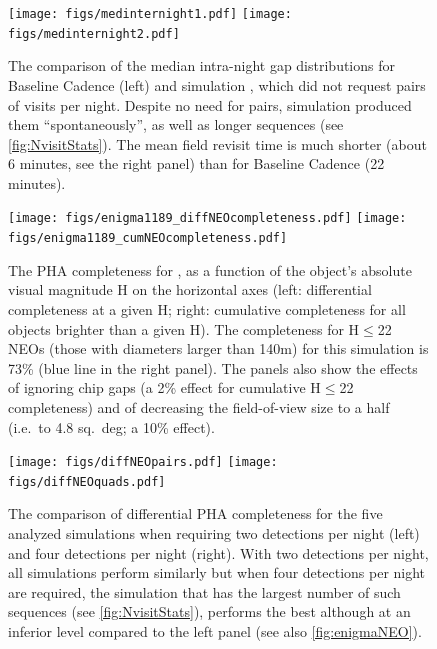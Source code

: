 \begin{figure}[t!]
\vskip -1.2in
\texttt{[image: figs/medinternight1.pdf]}
\texttt{[image: figs/medinternight2.pdf]}
\vskip -1.3in
\caption{%
The comparison of the median intra-night gap distributions for Baseline Cadence (left)
and simulation , which did not request pairs of visits per night.
Despite no need for pairs, simulation  produced them ``spontaneously'',
as well as longer sequences (see \autoref{fig:NvisitStats}). The mean field revisit
time is much shorter (about 6 minutes, see the right panel) than for Baseline Cadence
(22 minutes).}
\label{fig:intranightgapCompare}
\end{figure}

\begin{figure}[t!]
\vskip -1.1in
\texttt{[image: figs/enigma1189\_diffNEOcompleteness.pdf]}
\hskip -0.5in
\texttt{[image: figs/enigma1189\_cumNEOcompleteness.pdf]}
\vskip -1.2in
\caption{The PHA completeness for , as a function of the object's absolute
visual magnitude H on the horizontal axes (left: differential completeness at a given H;
right: cumulative completeness for all objects brighter than a given H).
The completeness for H$\le$22 NEOs (those with diameters larger than 140m)  for this
simulation is 73\% (blue line in the right panel). The panels also show the effects of ignoring
chip gaps (a 2\% effect for cumulative H$\le$22 completeness) and of decreasing the
field-of-view size to a half (i.e.\ to 4.8 sq.\ deg; a 10\% effect).}
\label{fig:enigmaNEO}
\end{figure}

\begin{figure}[th!]
\vskip -1.2in
\texttt{[image: figs/diffNEOpairs.pdf]}
\texttt{[image: figs/diffNEOquads.pdf]}
\vskip -1.3in
\caption{%
The comparison of differential PHA completeness for the five analyzed simulations
when requiring two detections per night (left) and four detections per night (right).
With two detections per night, all simulations perform similarly but when four
detections per night are required, the simulation that has the largest number
of such sequences (see \autoref{fig:NvisitStats}), performs the best although at an
inferior level compared to the left panel (see also \autoref{fig:enigmaNEO}).}
\label{fig:NEOquads}
\end{figure}


